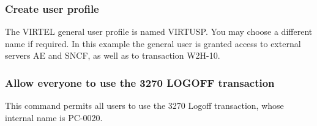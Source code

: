 \documentclass[letterpaper,10pt,english]{sphinxmanual}
\begin{document}
\subsubsection{Create user profile}
\label{\detokenize{Installation_Guide:create-user-profile}}
\begin{sphinxVerbatim}[commandchars=\\\{\}]
   
         
  
  
  
  
\end{sphinxVerbatim}


The VIRTEL general user profile is named VIRTUSP. You may choose a different name if required. In this example the general user is granted access to external servers AE and SNCF, as well as to transaction W2H-10.


\subsubsection{Allow everyone to use the 3270 LOGOFF transaction}
\label{\detokenize{Installation_Guide:allow-everyone-to-use-the-3270-logoff-transaction}}
\begin{sphinxVerbatim}[commandchars=\\\{\}]
  
\end{sphinxVerbatim}


This command permits all users to use the 3270 Logoff transaction, whose internal name is PC-0020.
\end{document}

